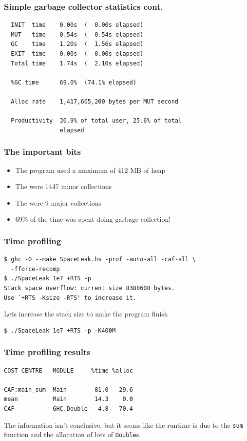 \documentclass{beamer}
\begin{document}
\begin{frame}[fragile]
  \frametitle{Simple garbage collector statistics cont.}

  \begin{verbatim}
  INIT  time    0.00s  (  0.00s elapsed)
  MUT   time    0.54s  (  0.54s elapsed)
  GC    time    1.20s  (  1.56s elapsed)
  EXIT  time    0.00s  (  0.00s elapsed)
  Total time    1.74s  (  2.10s elapsed)

  %GC time      69.0%  (74.1% elapsed)

  Alloc rate    1,417,605,200 bytes per MUT second

  Productivity  30.9% of total user, 25.6% of total
                elapsed
  \end{verbatim}
\end{frame}

\begin{frame}
  \frametitle{The important bits}

  \begin{itemize}
  \item The program used a maximum of 412 MB of heap
  \item The were 1447 minor collections
  \item The were 9 major collections
  \item 69\% of the time was spent doing garbage collection!
  \end{itemize}
\end{frame}

\begin{frame}[fragile]
  \frametitle{Time profiling}

  \begin{verbatim}
$ ghc -O --make SpaceLeak.hs -prof -auto-all -caf-all \
  -fforce-recomp
$ ./SpaceLeak 1e7 +RTS -p
Stack space overflow: current size 8388608 bytes.
Use `+RTS -Ksize -RTS' to increase it.
  \end{verbatim}

  Lets increase the stack size to make the program finish
  \begin{verbatim}
$ ./SpaceLeak 1e7 +RTS -p -K400M
  \end{verbatim}
\end{frame}

\begin{frame}[fragile]
  \frametitle{Time profiling results}

  \begin{verbatim}
COST CENTRE   MODULE     %time %alloc

CAF:main_sum  Main        81.0   29.6
mean          Main        14.3    0.0
CAF           GHC.Double   4.8   70.4
  \end{verbatim}

  The information isn't conclusive, but it seems like the runtime is
  due to the \lstinline!sum! function and the allocation of lots of
  \lstinline!Double!s.
\end{frame}
\end{document}
